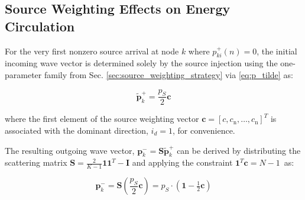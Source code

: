 \documentclass[journal]{IEEEtran}
\begin{document}


\subsection{Source Weighting Effects on Energy Circulation}
\label{sec:source_weighting_analysis}

For the very first nonzero source arrival at node $k$ where $p_{ki}^{+}(n)= 0$, the initial incoming wave vector is determined solely by the source injection using the one-parameter family from Sec. \ref{sec:source_weighting_strategy} via \eqref{eq:p_tilde} as:

\begin{equation}
\label{eq:p_injection}
\mathbf{\tilde p}_{k}^{+} = \frac{p_S}{2} \mathbf{c}
\end{equation}

where the first element of the source weighting vector \(\mathbf{c} = [c, c_{\text{n}}, \ldots ,c_{\text{n}}]^T\) is associated with the dominant direction, $i_d=1$, for convenience. 

The resulting outgoing wave vector, $\mathbf{p}_k^- = \mathbf{S}\mathbf{\tilde p}_{k}^+$ can be derived by distributing the scattering matrix $\mathbf{S} = \frac{2}{K-1} \mathbf{11}^T - \mathbf{I}$ and applying the constraint $\mathbf{1}^T \mathbf{c}  = N - 1$\ as:

\begin{equation}
\mathbf{p}_{k}^{-} = \mathbf{S}\left(\frac{p_S}{2}\mathbf{c}\right) 
= p_S \cdot(\mathbf{1} - \tfrac{1}{2}\mathbf{c}) 
\end{equation}

\end{document}
